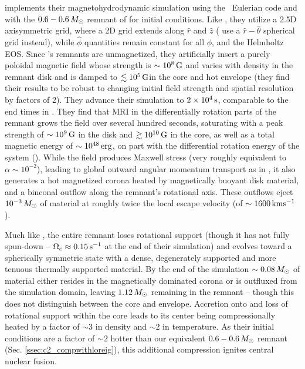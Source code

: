 \cite{ji+13} implements their magnetohydrodynamic simulation using the \flash\ Eulerian code \citep{fryx+00} and with the $0.6 - 0.6\,\Msun$ remnant of \citeal{loreig09} for initial conditions.  Like \cite{schw+12}, they utilize a 2.5D axisymmetric grid, where a 2D grid extends along $\hat{r}$ and $\hat{z}$ (\cite{schw+12} use a $\hat{r}-\hat{\theta}$ spherical grid instead), while $\hat{\phi}$ quantities remain constant for all $\phi$, and the Helmholtz EOS.  Since \citeal{loreig09}'s remnants are unmagnetized, they artificially insert a purely poloidal magnetic field whose strength is $\sim10^8\,\mathrm{G}$ and varies with density in the remnant disk and is damped to $\lesssim10^5\,\mathrm{G}$in the core and hot envelope (they find their results to be robust to changing initial field strength and spatial resolution by factors of 2).  They advance their simulation to $2\times10^4\,\mathrm{s}$, comparable to the end times in \cite{schw+12}.  They find that MRI in the differentially rotation parts of the remnant grows the field over several hundred seconds, saturating with a peak strength of $\sim10^9\,\mathrm{G}$ in the disk and $\gtrsim10^{10}\,\mathrm{G}$ in the core, as well as a total magnetic energy of $\sim10^{48}\,\mathrm{erg}$, on part with the differential rotation energy of the system (\citeal{zhu+15}).  While the field produces Maxwell stress (very roughly equivalent to $\alpha \sim 10^{-2}$), leading to global outward angular momentum transport as in \cite{schw+12}, it also generates a hot magnetized corona heated by magnetically buoyant disk material, and a binconal outflow along the remnant's rotational axis.  These outflows eject $10^{-3}\,\Msun$ of material at roughly twice the local escape velocity (of $\sim1600\,\mrm{km}\psec$).  

Much like \cite{schw+12}, the entire remnant loses rotational support (though it has not fully spun-down -- $\Omegac \approx 0.15\,\psec$ at the end of their simulation) and evolves toward a spherically symmetric state with a dense, degenerately supported and more tenuous thermally supported material.  By the end of the simulation $\sim0.08\,\Msun$ of material either resides in the magnetically dominated corona or is outfluxed from the simulation domain, leaving $1.12\,\Msun$ remaining in the remnant -- though this does not distinguish between the core and envelope.  Accretion onto and loss of rotational support within the core leads to its center being compressionally heated by a factor of $\sim3$ in density and $\sim2$ in temperature.  As their initial conditions are a factor of $\sim2$ hotter than our equivalent $0.6 - 0.6\,\Msun$ remnant (Sec. \ref{ssec:c2_compwithloreig}), this additional compression ignites central nuclear fusion.


